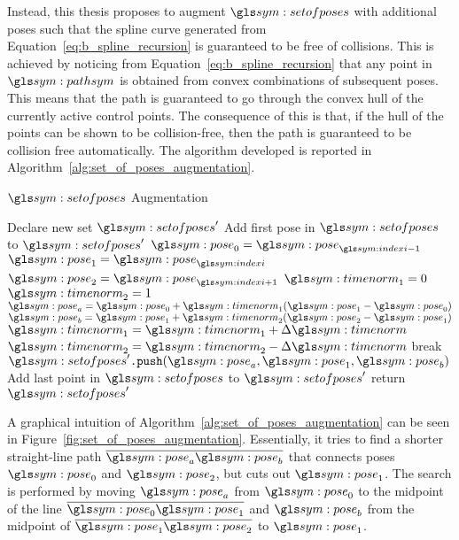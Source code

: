 		Instead, this thesis proposes to augment $\setofposes$ with additional
		poses such that the spline curve generated from
		Equation~\ref{eq:b_spline_recursion} is guaranteed to be free of
		collisions. This is achieved by noticing from
		Equation~\ref{eq:b_spline_recursion} that any point in $\pathsym$ is
		obtained from convex combinations of subsequent poses. This means that
		the path is guaranteed to go through the convex hull of the currently
		active control points. The consequence of this is that, if the hull of
		the points can be shown to be collision-free, then the path is
		guaranteed to be collision free automatically. The algorithm developed
		is reported in Algorithm~\ref{alg:set_of_poses_augmentation}.

		\begin{algorithm}[ht]
			\caption{$\setofposes$ Augmentation}%
			\label{alg:set_of_poses_augmentation}
			\begin{algorithmic}[1]
					\State{}Declare new set $\setofposes'$
					\State{}Add first pose in $\setofposes$ to $\setofposes'$
					\ForAll{$\pose_{\indexi} \in \setofposes\setminus
					\pose_{\initial}, \pose_{\goal}$}
						\State{}$\pose_0 = \pose_{\indexi - 1}$
						\State{}$\pose_1 = \pose_{\indexi}$
						\State{}$\pose_2 = \pose_{\indexi + 1}$
						\State{}$\timenorm_1 = 0$
						\State{}$\timenorm_2 = 1$
							\State{}$\pose_a = \pose_0 + \timenorm_1(\pose_1 -
								\pose_0)$
							\State{}$\pose_b = \pose_1 + \timenorm_2(\pose_2 -
								\pose_1)$
							\State{}$\timenorm_1 = \timenorm_1 + \Delta\timenorm$
							\State{}$\timenorm_2 = \timenorm_2 - \Delta\timenorm$
								\State{}break
							\EndIf{}
						\EndWhile
						\State{}$\setofposes'\code{.push}(\pose_a, \pose_1, \pose_b)$
					\EndFor{}
					\State{}Add last point in $\setofposes$ to $\setofposes'$
					\State{}return $\setofposes'$
				\EndProcedure
			\end{algorithmic}
		\end{algorithm}

		A graphical intuition of Algorithm~\ref{alg:set_of_poses_augmentation}
		can be seen in Figure~\ref{fig:set_of_poses_augmentation}. Essentially,
		it tries to find a shorter straight-line path
		$\vecline{\pose_a}{\pose_b}$ that connects poses $\pose_0$ and
		$\pose_2$, but cuts out $\pose_1$. The search is performed by moving
		$\pose_a$ from $\pose_0$ to the midpoint of the line
		$\vecline{\pose_0}{\pose_1}$ and $\pose_b$ from the midpoint of
		$\vecline{\pose_1}{\pose_2}$ to $\pose_1$.

